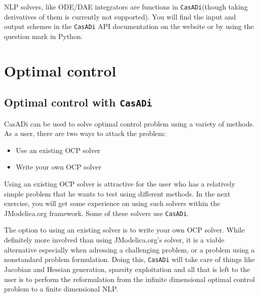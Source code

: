 \documentclass[a4paper,12pt]{book}
\newcommand{\CasADi}{\texttt{CasADi}\xspace}
\begin{document}
NLP solvers, like ODE/DAE integrators are functions in \CasADi (though taking derivatives of them is currently not supported). You will find the input and output schemes in the \CasADi API documentation on the website or by using the question mark in Python.

\chapter{Optimal control}

\section{Optimal control with \CasADi}
CasADi can be used to solve optimal control problem using a variety of methods. As a user, there are two ways to attack the problem:
\begin{itemize}
  \item Use an existing OCP solver
  \item Write your own OCP solver
\end{itemize}

Using an existing OCP solver is attractive for the user who has a relatively simple problem that he wants to test using different methods. In the next exercise, you will get some experience on using such solvers within the JModelica.org framework. Some of these solvers use \CasADi.

The option to using an existing solver is to write your own OCP solver. While definitely more involved than using JModelica.org's solver, it is a viable alternative especially when adressing a challenging problem, or a problem using a nonstandard problem formulation. Doing this,   \CasADi will take care of things like Jacobian and Hessian generation, sparsity exploitation and all that is left to the user is to perform the reformulation from the infinite dimensional optimal control problem to a finite dimensional NLP.
\end{document}
